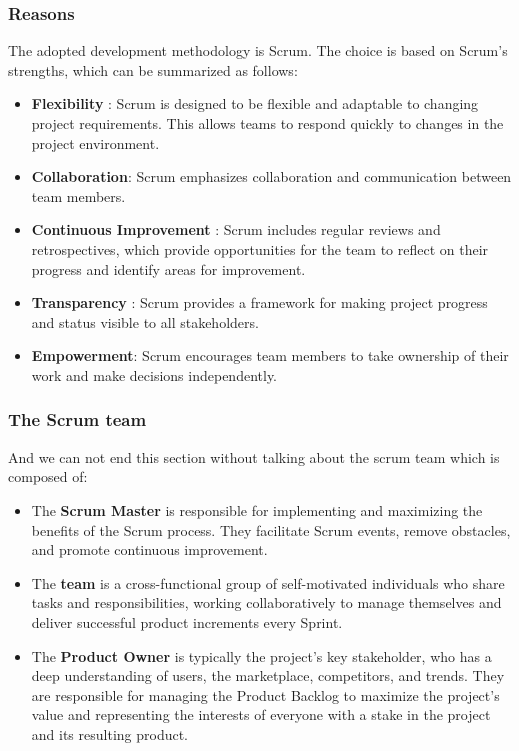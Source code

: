 \subsubsection{Reasons}
The adopted development methodology is Scrum. The choice is based on Scrum's strengths, which can be summarized as follows:
\begin{itemize}
\item \textbf{Flexibility} : Scrum is designed to be flexible and adaptable to changing project requirements. This allows teams to respond quickly to changes in the project environment.\cite{Aw15}\cite{PGC10}

\item \textbf{Collaboration}: Scrum emphasizes collaboration and communication between team members. \cite{Aw15}\cite{PGC10}

\item \textbf{Continuous Improvement} : Scrum includes regular reviews and retrospectives, which provide opportunities for the team to reflect on their progress and identify areas for improvement.\cite{Aw15}\cite{PGC10}

\item \textbf{Transparency} : Scrum provides a framework for making project progress and status visible to all stakeholders.\cite{Aw15}\cite{PGC10}

\item \textbf{Empowerment}: Scrum encourages team members to take ownership of their work and make decisions independently.\cite{Aw15}\cite{PGC10}
\end{itemize}
\subsubsection{The Scrum team}
And we can not end this section without talking about the scrum team  which is composed of:
\begin{itemize}

\item The \textbf{Scrum Master} is responsible for implementing and maximizing the benefits of the Scrum process. They facilitate Scrum events, remove obstacles, and promote continuous improvement.\cite{PGC10}
\item The \textbf{team} is a cross-functional group of self-motivated individuals who share tasks and responsibilities, working collaboratively to manage themselves and deliver successful product increments every Sprint.\cite{PGC10}
\item The \textbf{Product Owner} is typically the project's key stakeholder, who has a deep understanding of users, the marketplace, competitors, and trends. They are responsible for managing the Product Backlog to maximize the project's value and representing the interests of everyone with a stake in the project and its resulting product.\cite{PGC10}
\end{itemize}

